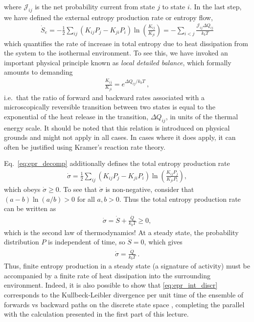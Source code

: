 %
where $\mathcal J_{ij}$ is the net probability current from state $j$ to state $i$.
In the last step, we have defined the external entropy production rate or entropy flow,
%
\begin{align}
    \dot S_e = - \frac{1}{2}\sum_{ij}
        ( K_{ij}P_j - K_{ji} P_i) 
    \ln \left( \frac{K_{ij}}{K_{ji}}\right) = - \sum_{i<j} \frac{\mathcal J_{ij} \Delta Q_{ij}}{k_b T}
\end{align}
%
which quantifies the rate of increase in total entropy due to heat dissipation from the system to the isothermal environment. To see this, we have invoked an important physical principle known as \emph{local detailed balance}, which formally amounts to demanding 
\begin{align}
    \frac{K_{ij}}{K_{ji}} = e^{\Delta Q_{ij} / k_b T}~,
\end{align}
i.e.\ that the ratio of forward and backward rates associated with a microscopically reversible transition between two states is equal to the exponential of the heat release in the transition, $\Delta Q_{ij}$, in units of the thermal energy scale. It should be noted that this relation is introduced on physical grounds and might not apply in all cases. In cases where it does apply, it can often be justified using Kramer's reaction rate theory.

Eq.~\eqref{eq:epr_decomp} additionally defines the total entropy production rate
%
\begin{align}
    \dot \sigma = 
    \frac{1}{2}\sum_{ij}
    \left(K_{ij}P_j - K_{ji} P_i\right) 
    \ln \left( \frac{K_{ij}P_j}{K_{ji} P_i}\right), \label{eq:epr_int_discr}
\end{align}
%
which obeys $\dot \sigma \geq 0$. To see that $\dot \sigma$ is non-negative, consider that $(a-b)\ln(a/b) > 0$ for all $a,b>0$.
Thus the total entropy production rate can be written as 
%
\begin{align}
    \dot \sigma = \dot S + \frac{\dot Q}{k_b T} \geq 0,
\end{align}
%
which is the second law of thermodynamics!
At a steady state, the probability distribution $P$ is independent of time, so $\dot S = 0$, which gives
%
\begin{align}
    \dot \sigma = \frac{\dot Q}{k_b T}~.
\end{align}
Thus, finite entropy production in a steady state (a signature of activity) must be accompanied by a finite rate of heat dissipation into the surrounding environment.
%
Indeed, it is also possible to show that \eqref{eq:epr_int_discr} corresponds to the Kullbeck-Leibler divergence per unit time of the ensemble of forwards vs backward paths on the discrete state space \cite{gaspard2004time}, completing the parallel with the calculation presented in the first part of this lecture. 




